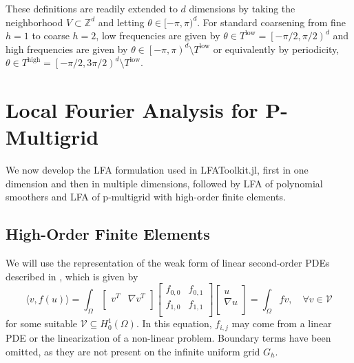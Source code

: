 \documentclass[review]{siamart190516}
\begin{document}
These definitions are readily extended to $d$ dimensions by taking the neighborhood $V \subset \mathbb Z^d$ and letting $\theta \in [-\pi,\pi)^d$.
For standard coarsening from fine $h=1$ to coarse $h=2$, low frequencies are given by $\theta \in T^{\text{low}} = \left[ - \pi / 2, \pi / 2 \right)^d$ and high frequencies are given by $\theta \in \left[-\pi, \pi \right)^d \setminus T^{\text{low}}$ or equivalently by periodicity, $\theta \in T^{\text{high}} = \left[ - \pi / 2, 3 \pi / 2 \right)^d \setminus T^{\text{low}}$.

\section{Local Fourier Analysis for P-Multigrid}\label{sec:lfa}

We now develop the LFA formulation used in LFAToolkit.jl, first in one dimension and then in multiple dimensions, followed by LFA of polynomial smoothers and LFA of p-multigrid with high-order finite elements.

\subsection{High-Order Finite Elements}\label{sec:highorder}

We will use the representation of the weak form of linear second-order PDEs described in \cite{brown2010efficient}, which is given by
\begin{equation}
\langle v, f \left( u \right) \rangle = \int_{\Omega}
\begin{bmatrix}
  v^T & \nabla v^T    \\
\end{bmatrix}
\begin{bmatrix}
  f_{0, 0} & f_{0, 1} \\
  f_{1, 0} & f_{1, 1} \\
\end{bmatrix}
\begin{bmatrix}
  u                   \\
  \nabla u            \\
\end{bmatrix}
= \int_{\Omega} f v,\quad \forall v \in \mathcal V
\end{equation}
for some suitable $\mathcal V \subseteq H_0^1 \left( \Omega \right)$.
In this equation, $f_{i, j}$ may come from a linear PDE or the linearization of a non-linear problem.
Boundary terms have been omitted, as they are not present on the infinite uniform grid $G_h$.
\end{document}
